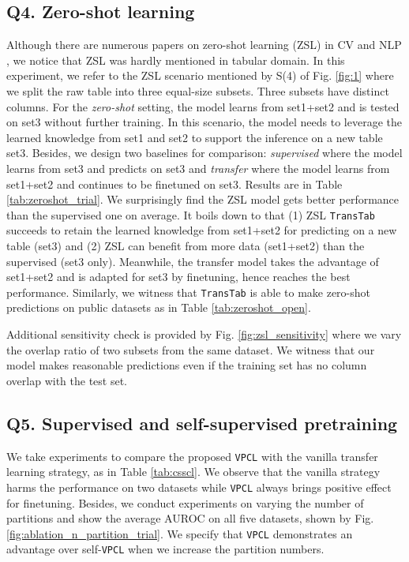 \subsection{Q4. Zero-shot learning}\label{sec:zsl}
Although there are numerous papers on zero-shot learning (ZSL) in CV and NLP \cite{romera2015embarrassingly,brown2020language,radford2021learning}, we notice that ZSL was hardly mentioned in tabular domain. In this experiment, we refer to the ZSL scenario mentioned by S(4) of Fig. \ref{fig:1} where we split the raw table into three equal-size subsets. Three subsets have distinct columns. For the \textit{zero-shot} setting, the model learns from set1+set2 and is tested on set3 without further training. In this scenario, the model needs to leverage the learned knowledge from set1 and set2 to support the inference on a new table set3. Besides, we design two baselines for comparison: \textit{supervised} where the model learns from set3 and predicts on set3 and \textit{transfer} where the model learns from set1+set2 and continues to be finetuned on set3. Results are in Table \ref{tab:zeroshot_trial}. We surprisingly find the ZSL model gets better performance than the supervised one on average. It boils down to that (1) ZSL \texttt{TransTab} succeeds to retain the learned knowledge from set1+set2 for predicting on a new table (set3) and (2) ZSL can benefit from more data (set1+set2) than the supervised (set3 only). Meanwhile, the transfer model takes the advantage of set1+set2 and is adapted for set3 by finetuning, hence reaches the best performance. Similarly, we witness that \texttt{TransTab} is able to make zero-shot predictions on public datasets as in Table \ref{tab:zeroshot_open}. 

Additional sensitivity check is provided by Fig. \ref{fig:zsl_sensitivity} where we vary the overlap ratio of two subsets from the same dataset. We witness that our model makes reasonable predictions even if the training set has no column overlap with the test set.

\subsection{Q5. Supervised and self-supervised pretraining}\label{sec:exp_rq5}
We take experiments to compare the proposed \texttt{VPCL} with the vanilla transfer learning strategy, as in Table \ref{tab:csscl}. We observe that the vanilla strategy harms the performance on two datasets while \texttt{VPCL} always brings positive effect for finetuning. Besides, we conduct experiments on varying the number of partitions and show the average AUROC on all five datasets, shown by Fig. \ref{fig:ablation_n_partition_trial}. We specify that \texttt{VPCL} demonstrates an advantage over self-\texttt{VPCL} when we increase the partition numbers.

